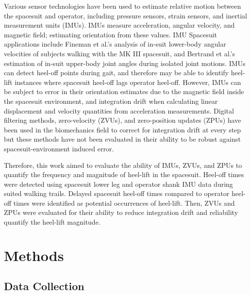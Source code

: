\documentclass[defaultstyle,11pt]{thesis}
\begin{document}
Various sensor technologies have been used to estimate relative motion between the spacesuit and operator, including pressure sensors\citep{Chappell2017}, strain sensors\citep{Vu2020}, and inertial measurement units (IMUs)\citep{Bertrand2014, Fineman2018}.
IMUs measure acceleration, angular velocity, and magnetic field; estimating orientation from these values.
IMU Spacesuit applications include Fineman et al.'s\citep{Fineman2018} analysis of in-suit lower-body angular velocities of subjects walking with the MK III spacesuit, and Bertrand et al.'s \citep{Bertrand2014} estimation of in-suit upper-body joint angles during isolated joint motions.
IMUs can detect heel-off points during gait\citep{Fischer2013, Rebula2013}, and therefore may be able to identify heel-lift instances where spacesuit heel-off lags operator heel-off.
However, IMUs can be subject to error in their orientation estimates due to the magnetic field inside the spacesuit environment, and integration drift when calculating linear displacement and velocity quantities from acceleration measurements.
Digital filtering methods, zero-velocity (ZVUs), and zero-position updates (ZPUs) have been used in the biomechanics field to correct for integration drift at every step \citep{Feliz2009, Rebula2013} but these methods have not been evaluated in their ability to be robust against spacesuit-environment induced error.

Therefore, this work aimed to evaluate the ability of IMUs, ZVUs, and ZPUs to quantify the frequency and magnitude of heel-lift in the spacesuit.
Heel-off times were detected using spacesuit lower leg and operator shank IMU data during suited walking trails.
Delayed spacesuit heel-off times compared to operator heel-off times were identified as potential occurrences of heel-lift.
Then, ZVUs and ZPUs were evaluated for their ability to reduce integration drift and reliability quantify the heel-lift magnitude.

\hypertarget{methods}{%
\section{Methods}\label{methods}}

\hypertarget{data-collection}{%
\subsection{Data Collection}\label{data-collection}}
\end{document}
